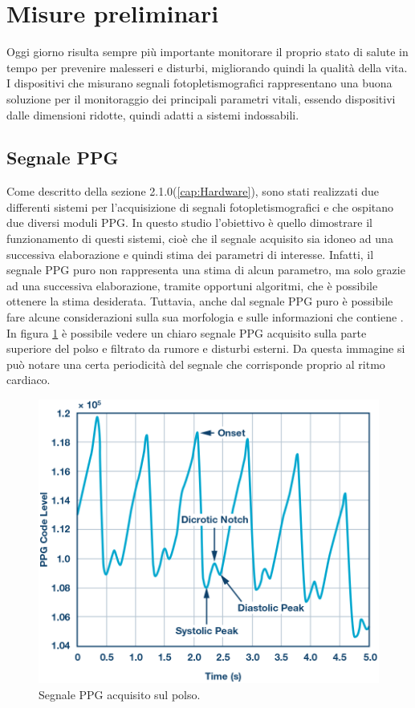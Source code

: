 \section{Misure preliminari}
Oggi giorno risulta sempre più importante monitorare il proprio stato di salute in tempo per prevenire malesseri e disturbi, migliorando quindi la qualità della vita. I dispositivi che misurano segnali fotopletismografici rappresentano una buona soluzione per il monitoraggio dei principali parametri vitali, essendo dispositivi dalle dimensioni ridotte, quindi adatti a sistemi indossabili.

\subsection{Segnale PPG}
Come descritto della sezione 2.1.0(\ref{cap:Hardware}), sono stati realizzati due differenti sistemi per l'acquisizione di segnali fotopletismografici e che ospitano due diversi moduli PPG. In questo studio l'obiettivo è quello dimostrare il funzionamento di questi sistemi, cioè che il segnale acquisito sia idoneo ad una successiva elaborazione e quindi stima dei parametri di interesse. Infatti, il segnale PPG puro non rappresenta una stima di alcun parametro, ma solo grazie ad una successiva elaborazione, tramite opportuni algoritmi, che è possibile ottenere la stima desiderata.
Tuttavia, anche dal segnale PPG puro è possibile fare alcune considerazioni sulla sua morfologia e sulle informazioni che contiene \cite{Foroozan2018}. In figura \ref{fig:Descrizione_Segnale_PPG} è possibile vedere un chiaro segnale PPG acquisito sulla parte superiore del polso e filtrato da rumore e disturbi esterni. Da questa immagine si può notare una certa periodicità del segnale che corrisponde proprio al ritmo cardiaco.
\begin{figure}[h]
	\centering
	\includegraphics[width=0.8\linewidth]{ImageFiles/Misure Preliminari/descrizione_segnale_ppg}
	\caption{Segnale PPG acquisito sul polso.}
	\label{fig:Descrizione_Segnale_PPG}
\end{figure}
